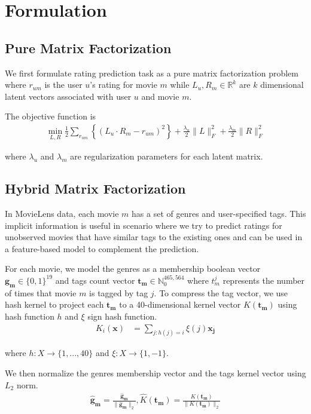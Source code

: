 \documentclass{article} %
\newcommand{\kernel}{K}
\newcommand{\normv}[1]{\|#1\|_2}
\begin{document}
\section{Formulation}

\subsection{Pure Matrix Factorization}

We first formulate rating prediction task as a pure matrix factorization
problem  where $r_{um}$ is the user $u$'s rating for movie $m$ while $L_u,
R_m \in \mathbb{R}^k$ are $k$ dimensional latent vectors associated with
user $u$ and movie $m$.

The objective function is
\begin{align}
\min_{L, R} \frac{1}{2}\sum_{r_{um}} \left\{(L_u \cdot R_m - r_{um})^2\right\}
	+ \frac{\lambda_u}{2}\|L\|^2_F + \frac{\lambda_m}{2}\|R\|^2_F \label{eq:mf}
\end{align}

where $\lambda_u$ and $\lambda_m$  are regularization parameters for each latent matrix.

\subsection{Hybrid Matrix Factorization}

In MovieLens data, each movie $m$ has a set of genres and user-specified
tags. This implicit information is useful in scenario where we try to
predict ratings for unobserved movies that have similar tags to the existing
ones and can be used in a feature-based model to complement the prediction.

For each movie, we model the genres as a membership boolean vector $\bm{g_m} \in
\{0,1\}^{19}$ and tags count vector $\bm{t_m} \in \mathbb{N}_0^{465,564}$ where
$t_m^j$ represents the number of times that movie $m$ is tagged by tag $j$.  To
compress the tag vector, we use hash kernel to project each
$\bm{t_m}$ to a 40-dimensional kernel vector $\kernel(\bm{t_m})$ using hash
function $h$ and $\xi$ sign hash function.
\begin{align}
	\kernel_i(\bm{x}) &= \sum_{j:h(j)=i} \xi(j) \bm{x_j}
\end{align}
\begin{center}
where $h: X \rightarrow \{1, ..., 40\}$ and $\xi: X \rightarrow \{1,-1\}$.
\end{center}

We then normalize the genres membership vector and the tags kernel vector using $L_2$ norm.
\begin{align}
	\bm{\hat{g}_m} = \frac{\bm{\hat{g}_m}}{\normv{\bm{\hat{g}_m}}},
	\hat{\kernel}(\bm{t_m}) = \frac{\kernel(\bm{t_m})}{\|\kernel(\bm{t_m})\|_2}
\end{align}
\end{document}

